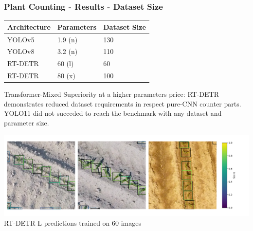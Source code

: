 \documentclass[aspectratio=43]{beamer}
\begin{document}
\begin{frame}
    \frametitle{Plant Counting - Results - Dataset Size}

    \begin{table}[H]
        \scriptsize
        \begin{tabularx}{\textwidth}{lXX}
        \toprule
        \textbf{Architecture} &\textbf{Parameters} & \textbf{Dataset Size} \\
        \midrule
        YOLOv5 & 1.9 (n) & 130 \\
        YOLOv8 & 3.2 (n) & 110 \\
        RT-DETR & 60 (l) & 60 \\
        RT-DETR & 80 (x) & 100 \\
        \bottomrule
        \end{tabularx}
    \end{table}

    \begin{block}{\scriptsize Transformer-Mixed Superiority at a higher parameters price:}
        \scriptsize
        RT-DETR demonstrates reduced dataset requirements in respect pure-CNN counter parts. YOLO11 did not succeded to reach the benchmark with any dataset and parameter size. 
    \end{block}

    \begin{center}
        \includegraphics[width=1\textwidth]{Imgs/many_shot_size_annotations.pdf}
        \tiny RT-DETR L predictions trained on 60 images
    \end{center}
\end{frame}
\end{document}
